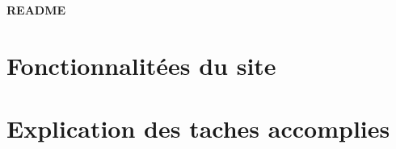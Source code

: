 \documentclass[15pt]{article}
\begin{document}
\begin{center}
    \huge{\textbf{README}}
\end{center}



\section{Fonctionnalitées du site}

\section{Explication des taches accomplies}
\end{document}
